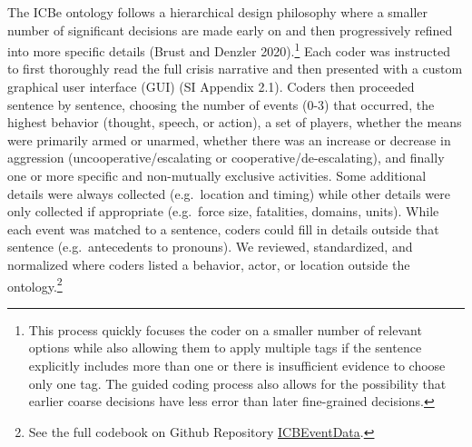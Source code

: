 \documentclass{article}
\begin{document}
The ICBe ontology follows a hierarchical design philosophy where a
smaller number of significant decisions are made early on and then
progressively refined into more specific details (Brust and Denzler
2020).\footnote{This process quickly focuses the coder on a smaller
  number of relevant options while also allowing them to apply multiple
  tags if the sentence explicitly includes more than one or there is
  insufficient evidence to choose only one tag. The guided coding
  process also allows for the possibility that earlier coarse decisions
  have less error than later fine-grained decisions.} Each coder was
instructed to first thoroughly read the full crisis narrative and then
presented with a custom graphical user interface (GUI) (SI Appendix
2.1). Coders then proceeded sentence by sentence, choosing the number of
events (0-3) that occurred, the highest behavior (thought, speech, or
action), a set of players, whether the means were primarily armed or
unarmed, whether there was an increase or decrease in aggression
(uncooperative/escalating or cooperative/de-escalating), and finally one
or more specific and non-mutually exclusive activities. Some additional
details were always collected (e.g.~location and timing) while other
details were only collected if appropriate (e.g.~force size, fatalities,
domains, units). While each event was matched to a sentence, coders
could fill in details outside that sentence (e.g.~antecedents to
pronouns). We reviewed, standardized, and normalized where coders listed
a behavior, actor, or location outside the ontology.\footnote{See the
  full codebook on Github Repository
  \href{https://urldefense.com/v3/__https://github.com/CenterForPeaceAndSecurityStudies/ICBEventData__;!!Mih3wA!WxDJtEczKfxGTh0S2Krunap8ReymFEL5iTWaSfOHeqlSdyfRx77zmjBSWO1OAm13$}{ICBEventData}.}
\end{document}
